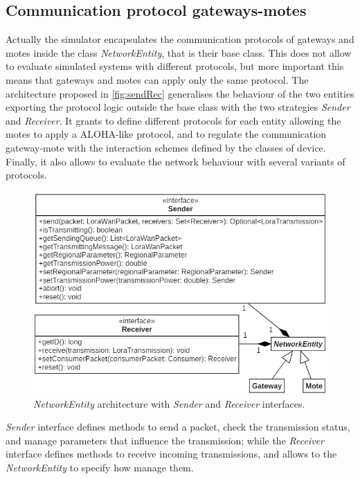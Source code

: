 \subsection*{Communication protocol gateways-motes}

Actually the simulator encapsulates the communication protocols of gateways and motes inside the class \mbox{\textit{NetworkEntity}}, that is their base class. 
This does not allow to evaluate simulated systems with different protocols, but more important this means that gateways and motes can apply only the same protocol.
The architecture proposed in \autoref{fig:sendRec} generalises the behaviour of the two entities exporting the protocol logic outside the base class with the two strategies \mbox{\textit{Sender}} and \mbox{\textit{Receiver}}. 
It grants to define different protocols for each entity allowing the motes to apply a ALOHA-like protocol, and to regulate the communication gateway-mote with the interaction schemes defined by the classes of device.
Finally, it also allows to evaluate the network behaviour with several variants of protocols.
% 
\begin{figure}[h]
    \centering
    \includegraphics{figures/sendRec.png}
    \caption{\mbox{\textit{NetworkEntity}} architecture with \mbox{\textit{Sender}} and \mbox{\textit{Receiver}} interfaces.}
    \label{fig:sendRec}
\end{figure}
 
\noindent \mbox{\textit{Sender}} interface defines methods to send a packet, check the transmission status, and manage parameters that influence the transmission; while the \mbox{\textit{Receiver}} interface defines methods to receive incoming transmissions, and allows to the \mbox{\textit{NetworkEntity}} to specify how manage them.

